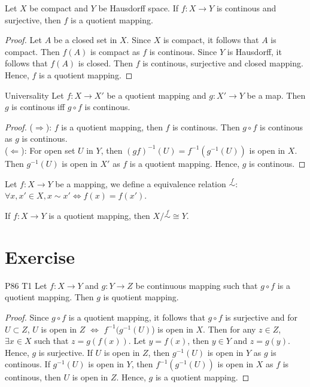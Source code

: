 \begin{proposition}{}{}
    Let $X$ be compact and $Y$ be Hausdorff space. If $f:X\rightarrow Y$ is continous and surjective, then
    $f$ is a quotient mapping.
\end{proposition}

\begin{proof}
    Let $A$ be a closed set in $X$. Since $X$ is compact, it follows that $A$ is compact. 
    Then $f(A)$ is compact as $f$ is continous. Since $Y$ is Hausdorff, it follows that $f(A)$ is closed.
    Then $f$ is continous, surjective and closed mapping. Hence, $f$ is a quotient mapping. 
\end{proof}

\begin{proposition}{Universality}{}
    Let $f:X\rightarrow X'$ be a quotient mapping and 
    $g:X'\rightarrow Y$ be a map. Then $g$ is continous iff $g\circ f$ is continous.
\end{proposition}

\begin{proof}
    ($\Rightarrow$): $f$ is a quotient mapping, then $f$ is continous. Then $g\circ f$ is continous as $g$ is continous.
    \\
    ($\Leftarrow$): For open set $U$ in $Y$, then $(gf)^{-1}(U)=f^{-1}(g^{-1}(U))$ is open in $X$.
    Then $g^{-1}(U)$ is open in $X'$ as $f$ is a quotient mapping. Hence, $g$ is continous. 
\end{proof}

Let $f:X\rightarrow Y$ be a mapping, we define a equivalence relation $\overset{f}{\sim}$:
$\forall x,x'\in X, x\sim x'\Leftrightarrow f(x)=f(x')$.

\begin{proposition}{}{}
    If $f:X\rightarrow Y$ is a quotient mapping, then $X/\overset{f}{\sim}\cong Y$.
\end{proposition}




\section{Exercise}

\begin{exercise}{P86 T1}{}
    Let $f:X\rightarrow Y$ and $g:Y\rightarrow Z$ be continuous mapping such that $g\circ f$ is a quotient mapping. 
    Then $g$ is quotient mapping.
\end{exercise}

\begin{proof}
    Since $g\circ f$ is a quotient mapping, it follows that $g\circ f$ is surjective and 
    for $U\subset Z$, $U$ is open in $Z$ $\Leftrightarrow$ $f^{-1}(g^{-1}(U)$) is open in $X$.
    Then for any $z\in Z$, $\exists x\in X$ such that $z=g(f(x))$. Let $y=f(x)$, then $y\in Y$ and $z=g(y)$.
    Hence, $g$ is surjective. If $U$ is open in $Z$, then $g^{-1}(U)$ is open in $Y$ as $g$ is continous.
    If $g^{-1}(U)$ is open in $Y$, then $f^{-1}(g^{-1}(U))$ is open in $X$ as $f$ is continous, then $U$ is open in $Z$.
    Hence, $g$ is a quotient mapping.
\end{proof}

